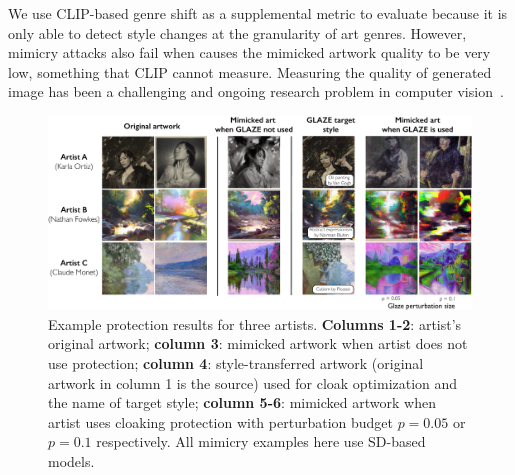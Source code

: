 We use CLIP-based genre shift as a supplemental metric to evaluate \system{}
because it is only able to detect style changes at the granularity of art
genres.
However, mimicry attacks also fail when
\system{} causes the mimicked artwork quality to be very low, something that 
CLIP cannot measure. Measuring the quality of generated image has been a
challenging and ongoing research problem in computer
vision~\cite{kynkaanniemi2022role,blau2018perception,karras2020training}.


\begin{figure}[t]
  \centering
  \includegraphics[width=0.9\linewidth]{plots/eval/big-result-full-emily.pdf}
  \vspace{-0.1in}
  \caption{Example \system{} protection results for three artists. {\bf
      Columns 1-2}: artist's original artwork; {\bf column 3}: mimicked
    artwork when artist does not use protection; {\bf column 4}:
    style-transferred artwork (original artwork in column 1 is the source)
    used for cloak optimization and the name of target style; {\bf column
      5-6}: mimicked artwork when artist uses cloaking protection with
    perturbation budget $p=0.05$ or $p=0.1$ respectively. All mimicry
    examples here use SD-based models.
  } %
  \label{fig:core-res}
\end{figure}

